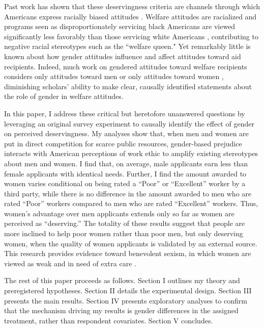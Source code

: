 \documentclass[12pt]{article}%
\begin{document}
\begin{doublespace}
Past work has shown that these deservingness criteria are channels through which Americans express racially biased attitudes \cite{gilens_why_2000}. Welfare attitudes are racialized \citep{desante_working_2013, gilliam_welfare_1999} and programs seen as disproportionately servicing black Americans are viewed significantly less favorably than those servicing white Americans \citep{winter_beyond_2006}, contributing to negative racial stereotypes such as the ``welfare queen." Yet remarkably little is known about how gender attitudes influence and affect attitudes toward aid recipients. Indeed, much work on gendered attitudes toward welfare recipients considers only attitudes toward men \citep{petersen2012deserves, aaroe2014crowding, willrich2000home} or only attitudes toward women \citep{monnat2010color, desante_working_2013, hayes_2020}, diminishing scholars' ability to make clear, causally identified statements about the role of gender in welfare attitudes.

In this paper, I address these critical but heretofore unanswered questions by leveraging an original survey experiment to causally identify the effect of gender on perceived deservingness. My analyses show that, when men and women are put in direct competition for scarce public resources, gender-based prejudice interacts with American perceptions of work ethic to amplify existing stereotypes about men and women. I find that, on average, male applicants earn less than female applicants with identical needs. Further, I find the amount awarded to women varies conditional on being rated a ``Poor” or ``Excellent” worker by a third party, while there is no difference in the amount awarded to men who are rated ``Poor” workers compared to men who are rated ``Excellent” workers. Thus, women’s advantage over men applicants extends only so far as women are perceived as ``deserving.” The totality of these results suggest that people are more inclined to help poor women rather than poor men, but only deserving women, when the quality of women applicants is validated by an external source. This research provides evidence toward benevolent sexism, in which women are viewed as weak and in need of extra care \citep{glick_hostile_1997, glick_ambivalent_2001}.

The rest of this paper proceeds as follows. Section I outlines my theory and preregistered hypotheses. Section II details the experimental design. Section III presents the main results. Section IV presents exploratory analyses to confirm that the mechanism driving my results is gender differences in the assigned treatment, rather than respondent covariates. Section V concludes.
\\


\end{doublespace}
\end{document}
